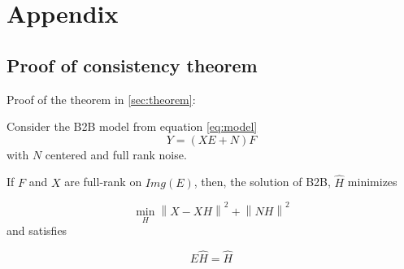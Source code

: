 \newpage
\appendix
\section{Appendix}

\subsection{Proof of consistency theorem}
\label{appendix:theorem_proof}

Proof of the theorem in \ref{sec:theorem}:


\begin{theorem}

     Consider the B2B model from equation \ref{eq:model} $$Y = (XE + N)F$$ with
     $N$ centered and full rank noise.

     If $F$ and $X$ are full-rank on $Img(E)$, then, the solution of B2B, $\hat
     H$ minimizes

     $$\min_H  \left \| X - XH\right\| ^2  + \left \| NH\right \| ^2$$ and satisfies

     $$E\hat H = \hat H$$
\end{theorem}
